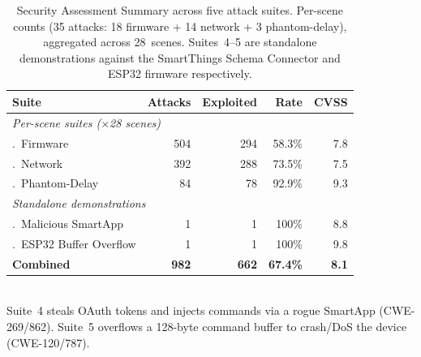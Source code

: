 \begin{table}[t]
\centering
\caption{Security Assessment Summary across five attack suites.
Per-scene counts (35 attacks: 18 firmware + 14 network + 3 phantom-delay),
aggregated across 28~scenes.  Suites~4--5 are standalone demonstrations
against the SmartThings Schema Connector and ESP32 firmware respectively.}
\label{tab:security-summary}
\small
\begin{tabular}{l r r r r}
\toprule
\textbf{Suite} & \textbf{Attacks} & \textbf{Exploited} & \textbf{Rate} & \textbf{CVSS} \\
\midrule
\multicolumn{5}{l}{\textit{Per-scene suites ($\times$28 scenes)}} \\
\quad 1.\ Firmware         & 504 & 294 & 58.3\% & 7.8 \\
\quad 2.\ Network          & 392 & 288 & 73.5\% & 7.5 \\
\quad 3.\ Phantom-Delay    &  84 &  78 & 92.9\% & 9.3 \\
\midrule
\multicolumn{5}{l}{\textit{Standalone demonstrations}} \\
\quad 4.\ Malicious SmartApp    & 1 & 1 & 100\% & 8.8 \\
\quad 5.\ ESP32 Buffer Overflow & 1 & 1 & 100\% & 9.8 \\
\midrule
\textbf{Combined} & \textbf{982} & \textbf{662} & \textbf{67.4\%} & \textbf{8.1} \\
\bottomrule
\end{tabular}
\\[2pt]
\footnotesize Suite~4 steals OAuth tokens and injects commands via a rogue SmartApp (CWE-269/862).
Suite~5 overflows a 128-byte command buffer to crash/DoS the device (CWE-120/787).
\end{table}